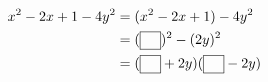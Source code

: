 $\begin{aligned}x^2-2x+1-4y^2&=(x^2-2x+1)-4y^2\\ &=(\blank)^2-(2y)^2\\ &=(\blank+2y)(\blank-2y)\end{aligned}$
